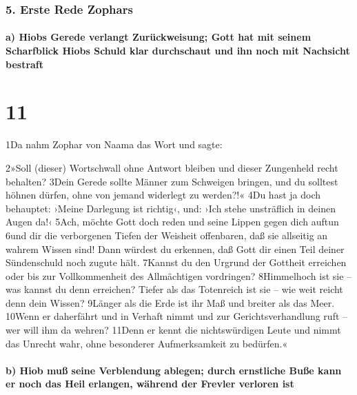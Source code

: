 \hypertarget{erste-rede-zophars}{%
\subsubsection{5. Erste Rede Zophars}\label{erste-rede-zophars}}

\hypertarget{a-hiobs-gerede-verlangt-zuruxfcckweisung-gott-hat-mit-seinem-scharfblick-hiobs-schuld-klar-durchschaut-und-ihn-noch-mit-nachsicht-bestraft}{%
\paragraph{a) Hiobs Gerede verlangt Zurückweisung; Gott hat mit seinem
Scharfblick Hiobs Schuld klar durchschaut und ihn noch mit Nachsicht
bestraft}\label{a-hiobs-gerede-verlangt-zuruxfcckweisung-gott-hat-mit-seinem-scharfblick-hiobs-schuld-klar-durchschaut-und-ihn-noch-mit-nachsicht-bestraft}}

\hypertarget{section-10}{%
\section{11}\label{section-10}}

1Da nahm Zophar von Naama das Wort und sagte:

2»Soll (dieser) Wortschwall ohne Antwort bleiben und dieser Zungenheld
recht behalten? 3Dein Gerede sollte Männer zum Schweigen bringen, und du
solltest höhnen dürfen, ohne von jemand widerlegt zu werden?!« 4Du hast
ja doch behauptet: ›Meine Darlegung ist richtig‹, und: ›Ich stehe
unsträflich in deinen Augen da!‹ 5Ach, möchte Gott doch reden und seine
Lippen gegen dich auftun 6und dir die verborgenen Tiefen der Weisheit
offenbaren, daß sie allseitig an wahrem Wissen sind! Dann würdest du
erkennen, daß Gott dir einen Teil deiner Sündenschuld noch zugute hält.
7Kannst du den Urgrund der Gottheit erreichen oder bis zur
Vollkommenheit des Allmächtigen vordringen? 8Himmelhoch ist sie -- was
kannst du denn erreichen? Tiefer als das Totenreich ist sie -- wie weit
reicht denn dein Wissen? 9Länger als die Erde ist ihr Maß und breiter
als das Meer. 10Wenn er daherfährt und in Verhaft nimmt und zur
Gerichtsverhandlung ruft -- wer will ihm da wehren? 11Denn er kennt die
nichtswürdigen Leute und nimmt das Unrecht wahr, ohne besonderer
Aufmerksamkeit zu bedürfen.«

\hypertarget{b-hiob-muuxdf-seine-verblendung-ablegen-durch-ernstliche-buuxdfe-kann-er-noch-das-heil-erlangen-wuxe4hrend-der-frevler-verloren-ist}{%
\paragraph{b) Hiob muß seine Verblendung ablegen; durch ernstliche Buße
kann er noch das Heil erlangen, während der Frevler verloren
ist}\label{b-hiob-muuxdf-seine-verblendung-ablegen-durch-ernstliche-buuxdfe-kann-er-noch-das-heil-erlangen-wuxe4hrend-der-frevler-verloren-ist}}

